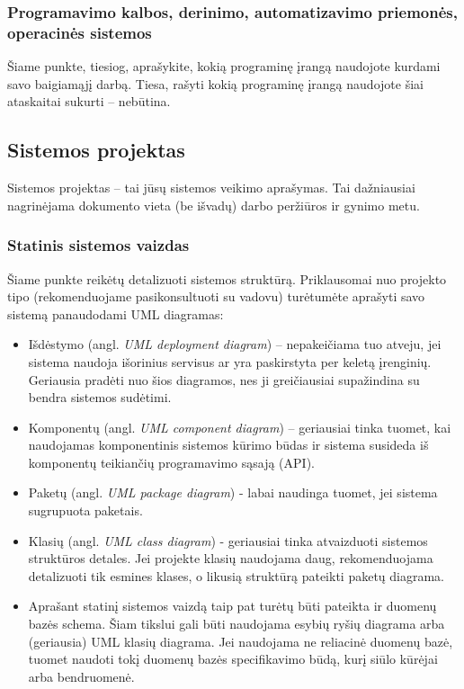 \documentclass{ktuthesis}
\begin{document}
  \subsubsection{Programavimo kalbos, derinimo, automatizavimo priemonės, operacinės sistemos}

  Šiame punkte, tiesiog, aprašykite, kokią programinę įrangą naudojote kurdami savo baigiamąjį darbą. Tiesa, rašyti kokią programinę įrangą naudojote šiai ataskaitai
  sukurti – nebūtina.

  \subsection{Sistemos projektas}

  Sistemos projektas – tai jūsų sistemos veikimo aprašymas. Tai dažniausiai nagrinėjama dokumento vieta (be išvadų) darbo peržiūros ir gynimo metu.

  \subsubsection{Statinis sistemos vaizdas}

  Šiame punkte reikėtų detalizuoti sistemos struktūrą. Priklausomai nuo projekto tipo (rekomenduojame pasikonsultuoti su vadovu) turėtumėte aprašyti
  savo sistemą panaudodami UML diagramas:
  \begin{itemize}[label={--}]
    \item Išdėstymo (angl. \textit{UML deployment diagram}) – nepakeičiama tuo atveju, jei sistema naudoja išorinius servisus ar yra paskirstyta
    per keletą įrenginių. Geriausia pradėti nuo šios diagramos, nes ji greičiausiai supažindina su bendra sistemos sudėtimi.
    \item Komponentų (angl. \textit{UML component diagram}) – geriausiai tinka tuomet, kai naudojamas komponentinis sistemos kūrimo būdas ir sistema
    susideda iš komponentų teikiančių programavimo sąsają (API).
    \item Paketų (angl. \textit{UML package diagram}) - labai naudinga tuomet, jei sistema sugrupuota paketais.
    \item Klasių (angl. \textit{UML class diagram}) - geriausiai tinka atvaizduoti sistemos struktūros detales. Jei projekte klasių naudojama daug,
    rekomenduojama detalizuoti tik esmines klases, o likusią struktūrą pateikti paketų diagrama.
    \item Aprašant statinį sistemos vaizdą taip pat turėtų būti pateikta ir duomenų bazės schema. Šiam tikslui gali būti naudojama esybių ryšių diagrama arba (geriausia)
    UML klasių diagrama. Jei naudojama ne reliacinė duomenų bazė, tuomet naudoti tokį duomenų bazės specifikavimo būdą, kurį siūlo kūrėjai arba bendruomenė.
  \end{itemize}
\end{document}
